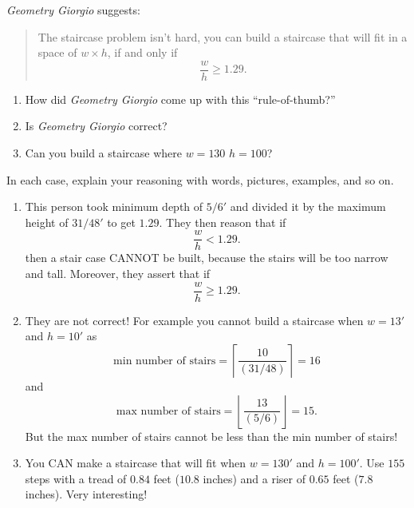 \documentclass[noauthor,nooutcomes,handout]{ximera}
\begin{document}
\begin{question}
  \textit{Geometry Giorgio} suggests:
  \begin{quote}
    The staircase problem isn't hard, you can build a staircase that
    will fit in a space of $w\times h$, if and only if
    \[
    \frac{w}{h} \ge 1.29.
    \]
  \end{quote}
  \begin{enumerate}
    \item How did \textit{Geometry Giorgio} come up with this ``rule-of-thumb?''
    \item Is \textit{Geometry Giorgio} correct?
    \item Can you build a staircase where $w=130$ $h=100$? 
  \end{enumerate}
  In each case, explain your reasoning with words, pictures, examples, and so on.
  \begin{freeResponse}
    \begin{enumerate}
    \item This person took minimum depth of $5/6'$ and divided it by
      the maximum height of $31/48'$ to get $1.29$. They then reason that if
      \[
      \frac{w}{h} <1.29.
      \]
      then a stair case CANNOT be built, because the stairs will be
      too narrow and tall. Moreover, they assert that if
      \[
      \frac{w}{h} \ge 1.29.
      \]
    \item They are not correct! For example you cannot build a
      staircase when $w=13'$ and $h=10'$ as
      \[
      \text{min number of stairs} = \left\lceil
      \frac{10}{\left(31/48\right)} \right\rceil=16
      \]
      and
      \[
      \text{max number of stairs} = \left\lfloor
      \frac{13}{\left(5/6\right)} \right\rfloor=15.
      \]
      But the max number of stairs cannot be less than the min number of stairs!
    \item You CAN make a staircase that will fit when $w=130'$ and
      $h=100'$. Use $155$ steps with a tread of $0.84$ feet ($10.8$
      inches) and a riser of $0.65$ feet ($7.8$ inches). Very interesting!
    \end{enumerate}
  \end{freeResponse}
\end{question}
\end{document}
